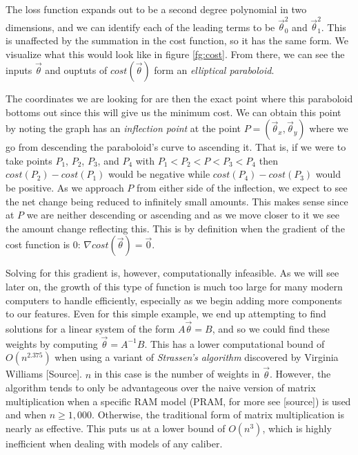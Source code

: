 The loss function expands out to be a second degree polynomial in two
dimensions, and we can identify each of the leading terms to be $\vec\theta_0^2$ and
$\vec\theta_1^2$. This is unaffected by the summation in the cost function, so it
has the same form. We visualize what this would look like in figure
\ref{fg:cost}. From there, we can see the inputs $\vec\theta$ and ouptuts of
$cost(\vec\theta)$ form an \emph{elliptical paraboloid}.

The coordinates we are looking for are then the exact point where this
paraboloid bottoms out since this will give us the minimum cost. We can obtain
this point by noting the graph has an \emph{inflection point} at the point $P =
(\vec\theta_x, \vec\theta_y)$ where we go from descending the paraboloid's curve to
ascending it. That is, if we were to take points $P_1$, $P_2$, $P_3$, and $P_4$
with $P_1 < P_2 < P < P_3 < P_4$ then $cost(P_2) - cost(P_1)$ would be negative
while $cost(P_4) - cost(P_3)$ would be positive. As we approach $P$ from either
side of the inflection, we expect to see the net change being
reduced to infinitely small amounts. This makes sense since at
$P$ we are neither descending or ascending and as we move closer to it we see
the amount change reflecting this. This is by definition when the gradient of
the cost function is 0: $\nabla cost(\vec\theta) = \vec{0}$.

Solving for this gradient is, however, computationally infeasible. As we will
see later on, the growth of this type of function is much too large for many
modern computers to handle efficiently, especially as we begin adding more
components to our features. Even for this simple example, we end up attempting
to find solutions for a linear system of the form $A\vec\theta = B$, and so we could find these weights
by computing $\vec\theta =A^{-1}B$. This has a lower computational bound of
$O(n^{2.375})$ when using a variant of \emph{Strassen's algorithm} discovered by
Virginia Williams [Source]. $n$ in this case is the number of weights in
$\vec\theta$. However, the algorithm tends to only be advantageous over the naive
version of matrix multiplication when a specific RAM model (PRAM, for more see
[source]) is used and when $n \geq 1,000$. Otherwise, the traditional form of
matrix multiplication is nearly as effective. This puts us at a lower bound of
$O(n^3)$, which is highly inefficient when dealing with models of any caliber.

